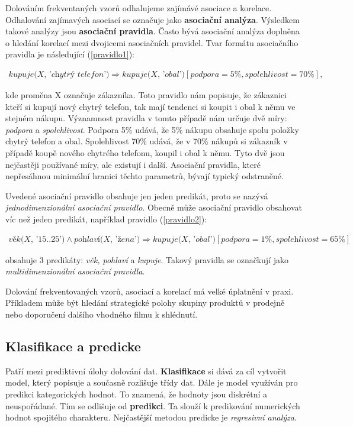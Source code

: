 Dolováním frekventaných vzorů odhalujeme zajímávé asociace a korelace. Odhalování zajímavých asociací se označuje jako \textbf{asociační analýza}. Výsledkem takové analýzy jsou \textbf{asociační pravidla}. Často bývá asociační analýza doplněna o hledání korelací mezi dvojicemi asociačních pravidel. \cite{Dunham} Tvar formátu asociačního pravidla je následující (\ref{pravidlo1}):

\begin{align}
    \textit{kupuje(X, 'chytrý telefon')}  \Rightarrow \textit{kupuje(X, 'obal')} [\textit{podpora} = 5\%, \textit{spolehlivost} = 70\%],
    \label{pravidlo1}
\end{align}

kde proměna X označuje zákazníka. Toto pravidlo nám popisuje, že zákaznici kteří si kupují nový chytrý telefon, tak mají tendenci si koupit i obal k němu ve stejném nákupu. Významnost pravidla v tomto případě nám určuje dvě míry: \textit{podpora} a  \textit{spolehlivost}. Podpora 5\% udává, že 5\% nákupu obsahuje spolu položky chytrý telefon a obal. Spolehlivost 70\% udává, že v 70\% nákupů si zákazník v případě koupě nového chytrého telefonu, koupil i obal k němu. Tyto dvě jsou nejčastěji používané míry, ale existují i další. Asociační pravidla, které nepřesáhnou minimální hranici těchto parametrů, bývají typický odstraněné.

Uvedené asociační pravidlo obsahuje jen jeden predikát, proto se nazývá \textit{jednodimenzionální asociační pravidlo}. Obecně může asociační pravidlo obsahovat víc než jeden predikát, například pravidlo (\ref{pravidlo2}):

\begin{align}
    \textit{věk(X, '15..25')} \wedge \textit{pohlaví(X, 'žena')} \Rightarrow \textit{kupuje(X, 'obal')}[\textit{podpora} = 1\%, \textit{spolehlivost} = 65\%]
    \label{pravidlo2}
\end{align}
     
obsahuje 3 predikáty: \textit{věk, pohlaví} a \textit{kupuje}. Takový pravidla se označkují jako \textit{multidimenzionální asociační pravidla}. \cite{Han}

Dolování frekventovaných vzorů, asociací a korelací má velké úplatnění v praxi. Příkladem může být hledání strategické polohy skupiny produktů v prodejně nebo doporučení dalšího vhodného filmu k shlédnutí.

\subsection*{Klasifikace a predicke}
Patří mezi prediktivní úlohy dolování dat. \textbf{Klasifikace} si dává za cíl vytvořit model, který popisuje a současně rozlišuje třídy dat. Dále je model využíván pro predikci kategorických hodnot. To znamená, že hodnoty jsou diskrétní a neuspořádané. Tím se odlišuje od \textbf{predikci}. Ta slouží k predikování numerických hodnot spojitého charakteru. Nejčastější metodou predicke je \textit{regresivní analýza}. \cite{Dunham}

